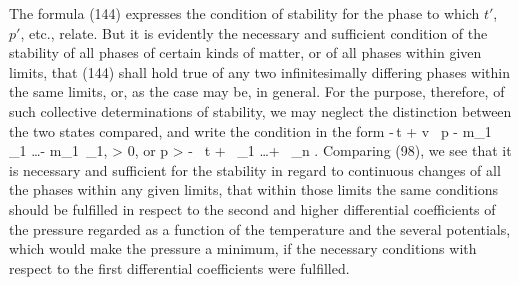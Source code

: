 \documentclass[12pt]{article}
\begin{document}
The formula (144) expresses the condition of stability for the phase to which $t'$, $p'$, etc., relate.  But it is evidently the necessary and sufficient condition of the stability of all phases of certain kinds of matter, or of all phases within given limits, that (144) shall hold true of any two infinitesimally differing phases within the same limits, or, as the case may be, in general.  For the purpose, therefore, of such collective determinations of stability, we may neglect the distinction between the two states compared, and write the condition in the form
\eqs  -\eta \,\Delta t + v \, \Delta p - m_1 \, \Delta \mu_1 \dots - m_1 \,\Delta \mu_1, > 0, \label{148}\eqe
or
\eqs 
\Delta p > - \, \Delta t +  \, \Delta \mu_1  \dots +  \, \Delta \mu_n .\label{149}
\eqe
Comparing (98), we see that it is necessary and sufficient for the stability in regard to continuous changes of all the phases within any given limits, that within those limits the same conditions should be fulfilled in respect to the second and higher differential coefficients of the pressure regarded as a function of the temperature and the several potentials, which would make the pressure a minimum, if the necessary conditions with respect to the first differential coefficients were fulfilled.
\end{document}
